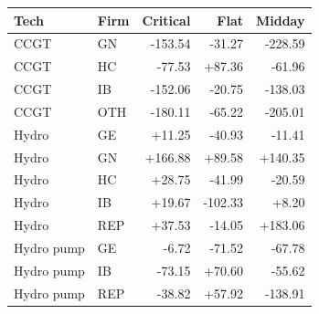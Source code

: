\begin{tabular}{l l r r r}
\toprule
Tech & Firm & Critical & Flat & Midday \\
\midrule
CCGT & GN & -153.54 & -31.27 & -228.59 \\
CCGT & HC & -77.53 & +87.36 & -61.96 \\
CCGT & IB & -152.06 & -20.75 & -138.03 \\
CCGT & OTH & -180.11 & -65.22 & -205.01 \\
Hydro & GE & +11.25 & -40.93 & -11.41 \\
Hydro & GN & +166.88 & +89.58 & +140.35 \\
Hydro & HC & +28.75 & -41.99 & -20.59 \\
Hydro & IB & +19.67 & -102.33 & +8.20 \\
Hydro & REP & +37.53 & -14.05 & +183.06 \\
Hydro pump & GE & -6.72 & -71.52 & -67.78 \\
Hydro pump & IB & -73.15 & +70.60 & -55.62 \\
Hydro pump & REP & -38.82 & +57.92 & -138.91 \\
\bottomrule
\end{tabular}